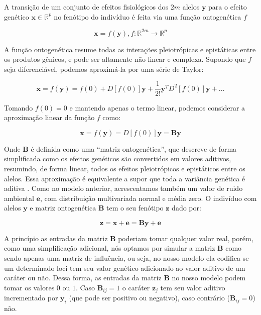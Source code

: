 A transição de um conjunto de efeitos fisiológicos dos $2m$ alelos
$\mathbf{y}$ para o efeito genético $\mathbf{x} \in \mathbb{R}^p$  no
fenótipo do indivíduo é feita via uma função ontogenética $f$

\begin{equation}
    \mathbf{x} = f(\mathbf{y}), f:\mathbb{R}^{2m} \rightarrow \mathbb{R}^{p}
\end{equation}

A função ontogenética resume todas as interações pleiotrópicas e
epistáticas entre os produtos gênicos, e pode ser altamente não linear e complexa.
Supondo que $f$ seja diferenciável, podemos aproximá-la por uma série de
Taylor:

\begin{equation}
\mathbf{x} = f(\mathbf{y}) = f(0) + D[f(0)]\mathbf{y}  + \frac{1}{2!} \mathbf{y}^T D^2 [f(0)] \mathbf{y} + \ldots
\end{equation}

Tomando $f(0) = 0$ e mantendo apenas o termo linear, podemos considerar
a aproximação linear da função $f$ como:

\begin{equation}
    \mathbf{x} = f(\mathbf{y}) = D[f(0)]\mathbf{y} = \mathbf{B}\mathbf{y}
\end{equation}

Onde $\mathbf{B}$ é definida como uma ``matriz ontogenética'', que descreve de
forma simplificada como os efeitos genéticos são convertidos em 
valores aditivos, resumindo, de forma linear, todos os efeitos pleiotrópicos e
epistáticos entre os alelos.
Essa aproximação é equivalente a supor que toda a variância genética é aditiva \citep{Wagner1989}.
Como no modelo anterior, acrescentamos também um valor de ruido
ambiental $\mathbf{e}$, com distribuição multivariada normal e média zero.
O indivíduo com alelos $\mathbf{y}$ e matriz ontogenética $\mathbf{B}$
tem o seu fenótipo $\mathbf{z}$ dado por:

\begin{equation}
    \mathbf{z} = \mathbf{x} + \mathbf{e} = \mathbf{By} + \mathbf{e}
\label{matrizB}
\end{equation}

A princípio as entradas da matriz $\mathbf{B}$ poderiam tomar qualquer
valor real, porém, como uma simplificação adicional, nós optamos por
simular a matriz $\mathbf{B}$ como sendo apenas uma matriz de
influência, ou seja, no nosso modelo ela codifica se um determinado loci
tem seu valor genético adicionado ao valor aditivo de um caráter ou não.
Dessa forma, as entradas da matriz $\mathbf{B}$ no nosso modelo podem
tomar os valores $0$ ou $1$.
Caso $\mathbf{B}_{ij} = 1$ o caráter $\mathbf{z}_j$ tem seu valor
aditivo incrementado por $\mathbf{y}_i$ (que pode ser positivo ou
negativo), caso contrário ($\mathbf{B}_{ij} = 0$) não.


